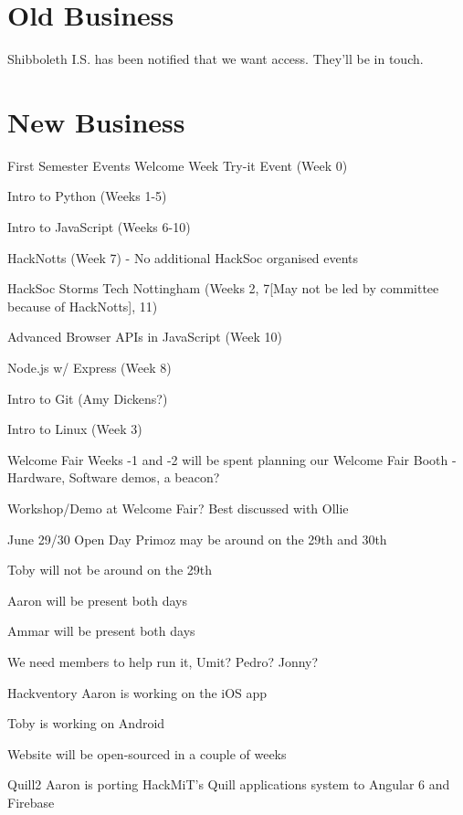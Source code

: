 \documentclass[11pt,hacksoc]{meetingmins}
\begin{document}
\section{Old Business}
\begin{items}
	\item
	Shibboleth
		\subitem
		I.S. has been notified that we want access. They'll be in touch.
\end{items}

\section{New Business}
\begin{items}
	
	\item
	First Semester Events
		\subitem
		Welcome Week Try-it Event (Week 0)
		
		\subitem
		Intro to Python (Weeks 1-5)
		
		\subitem
		Intro to JavaScript (Weeks 6-10)
		
		\subitem
		HackNotts (Week 7) - No additional HackSoc organised events
		
		\subitem
		HackSoc Storms Tech Nottingham (Weeks 2, 7[May not be led by committee because of HackNotts], 11)
		
		\subitem
		Advanced Browser APIs in JavaScript (Week 10)
		
		\subitem
		Node.js w/ Express (Week 8)
		
		\subitem
		Intro to Git (Amy Dickens?)
		
		\subitem
		Intro to Linux (Week 3)
	
	\item
	Welcome Fair
		\subitem
		Weeks -1 and -2 will be spent planning our Welcome Fair Booth - Hardware, Software demos, a beacon?
		
		\subitem
		Workshop/Demo at Welcome Fair? Best discussed with Ollie
	
	\item
	June 29/30 Open Day
		\subitem
		Primoz may be around on the 29th and 30th
		
		\subitem
		Toby will not be around on the 29th
		
		\subitem
		Aaron will be present both days
		
		\subitem
		Ammar will be present both days
		
		\subitem
		We need members to help run it, Umit? Pedro? Jonny?
	
	\item
	Hackventory
		\subitem
		Aaron is working on the iOS app
		
		\subitem
		Toby is working on Android
		
		\subitem
		Website will be open-sourced in a couple of weeks
	
	\item
	Quill2
		\subitem
		Aaron is porting HackMiT's Quill applications system to Angular 6 and Firebase
	
\end{items}

\vspace{1em}
\end{document}
